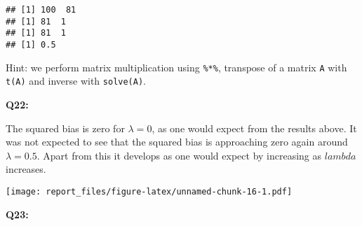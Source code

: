 \documentclass[]{article}
\newenvironment{Shaded}{\begin{snugshade}}{\end{snugshade}}
\newcommand{\KeywordTok}[1]{\textcolor[rgb]{0.13,0.29,0.53}{\textbf{#1}}}
\newcommand{\DataTypeTok}[1]{\textcolor[rgb]{0.13,0.29,0.53}{#1}}
\newcommand{\DecValTok}[1]{\textcolor[rgb]{0.00,0.00,0.81}{#1}}
\newcommand{\StringTok}[1]{\textcolor[rgb]{0.31,0.60,0.02}{#1}}
\newcommand{\OtherTok}[1]{\textcolor[rgb]{0.56,0.35,0.01}{#1}}
\newcommand{\ControlFlowTok}[1]{\textcolor[rgb]{0.13,0.29,0.53}{\textbf{#1}}}
\newcommand{\OperatorTok}[1]{\textcolor[rgb]{0.81,0.36,0.00}{\textbf{#1}}}
\newcommand{\NormalTok}[1]{#1}
\begin{document}
\begin{verbatim}
## [1] 100  81
## [1] 81  1
## [1] 81  1
## [1] 0.5
\end{verbatim}

Hint: we perform matrix multiplication using \texttt{\%*\%}, transpose
of a matrix \texttt{A} with \texttt{t(A)} and inverse with
\texttt{solve(A)}.

\textbf{Q22:}

The squared bias is zero for \(\lambda = 0\), as one would expect from
the results above. It was not expected to see that the squared bias is
approaching zero again around \(\lambda = 0.5\). Apart from this it
develops as one would expect by increasing as \(lambda\) increases.

\begin{Shaded}
\end{Shaded}

\texttt{[image: report\_files/figure-latex/unnamed-chunk-16-1.pdf]}

\textbf{Q23:}
\end{document}
